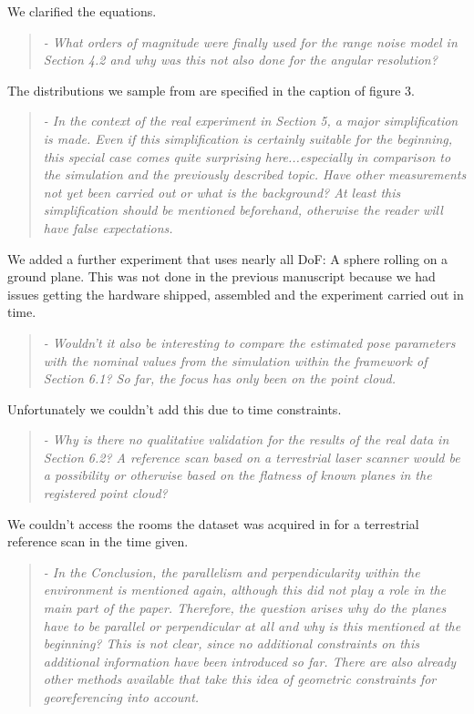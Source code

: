 \documentclass{article}
\newenvironment{itquote}
  {\begin{quote}\itshape}
  {\end{quote}\ignorespacesafterend}
\begin{document}
We clarified the equations.

\begin{itquote} 
- What orders of magnitude were finally used for the range noise
model in Section 4.2 and why was this not also done for the angular
resolution?
\end{itquote}

The distributions we sample from are specified in the caption of 
figure 3. 

\begin{itquote}
- In the context of the real experiment in Section 5, a major
simplification is made. Even if this simplification is certainly
suitable for the beginning, this special case comes quite surprising
here...especially in comparison to the simulation and the previously
described topic. Have other measurements not yet been carried out or
what is the background? At least this simplification should be
mentioned beforehand, otherwise the reader will have false
expectations.
\end{itquote}

We added a further experiment that uses nearly all DoF: A sphere rolling
on a ground plane. This was not done in the previous manuscript because
we had issues getting the hardware shipped, assembled and the experiment 
carried out in time.

\begin{itquote}
- Wouldn't it also be interesting to compare the estimated pose
parameters with the nominal values from the simulation within the
framework of Section 6.1? So far, the focus has only been on the
point cloud.
\end{itquote}

Unfortunately we couldn't add this due to time constraints.

\begin{itquote}
- Why is there no qualitative validation for the results of the real
data in Section 6.2? A reference scan based on a terrestrial laser
scanner would be a possibility or otherwise based on the flatness of
known planes in the registered point cloud?
\end{itquote}

We couldn't access the rooms the dataset was acquired in for a terrestrial 
reference scan in the time given. 

\begin{itquote}
- In the Conclusion, the parallelism and perpendicularity within the
environment is mentioned again, although this did not play a role in
the main part of the paper. Therefore, the question arises why do
the planes have to be parallel or perpendicular at all and why is
this mentioned at the beginning? This is not clear, since no
additional constraints on this additional information have been
introduced so far. There are also already other methods available
that take this idea of geometric constraints for georeferencing into
account.
\end{itquote}
\end{document}
